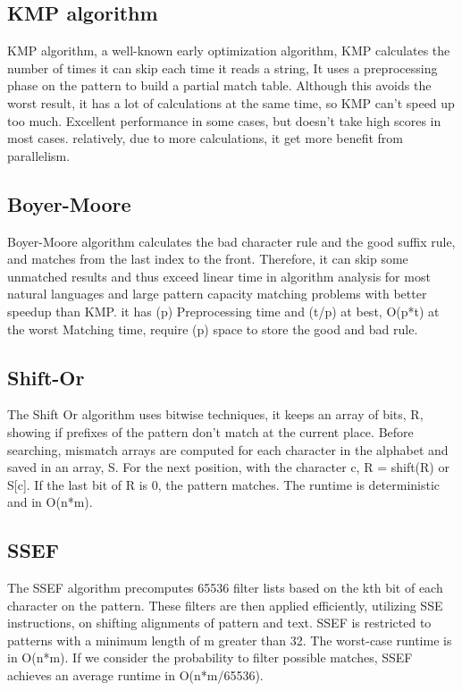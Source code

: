 \documentclass[11pt]{article}       %
\begin{document}
\subsection{KMP algorithm}\label{kmp}
KMP algorithm, a well-known early optimization algorithm, KMP calculates the number of times it can skip each time it reads a string, It uses a preprocessing phase on the pattern to build a partial match table. Although this avoids the worst result, it has a lot of calculations at the same time, so KMP can’t speed up too much. Excellent performance in some cases, but doesn’t take high scores in most cases. relatively, due to more calculations, it get more benefit from parallelism.

\subsection{Boyer-Moore}\label{bm}
Boyer-Moore algorithm calculates the bad character rule and the good suffix rule, and matches from the last index to the front. Therefore, it can skip some unmatched results and thus exceed linear time in algorithm analysis for most natural languages and large pattern capacity matching problems with better speedup than KMP. it has (p) Preprocessing time and  (t/p) at best, O(p*t) at the worst Matching time, require (p) space to store the good and bad rule.

\subsection{Shift-Or}\label{so}
The Shift Or algorithm uses bitwise techniques\cite{Matching}, it keeps an array of bits, R, showing if prefixes of the pattern don't match at the current place. Before searching, mismatch arrays are computed for each character in the alphabet and saved in an array, S. For the next position, with the character c, R = shift(R) or S[c]. If the last bit of R is 0, the pattern matches. The runtime is deterministic and in O(n*m).

\subsection{SSEF}\label{SSEF}
The SSEF algorithm precomputes 65536 filter lists based on the kth bit of each character on the pattern. These filters are then applied efficiently, utilizing SSE instructions, on shifting alignments of pattern and text. SSEF is restricted to patterns with a minimum length of m greater than 32. The worst-case runtime is in O(n*m). If we consider the probability to filter possible matches, SSEF achieves an average runtime in O(n*m/65536).
\end{document}
